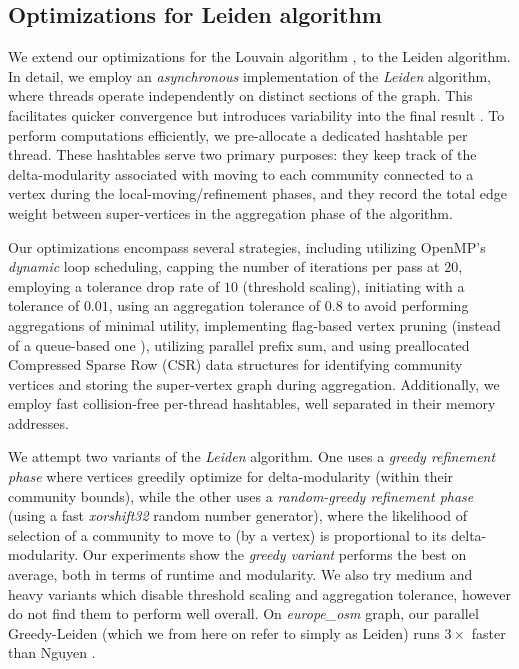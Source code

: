 \subsection{Optimizations for Leiden algorithm}
\label{sec:leiden}

We extend our optimizations for the Louvain algorithm \cite{sahu2023gvelouvain}, to the Leiden algorithm. In detail, we employ an \textit{asynchronous} implementation of the \textit{Leiden} algorithm, where threads operate independently on distinct sections of the graph. This facilitates quicker convergence but introduces variability into the final result \cite{com-blondel08}. To perform computations efficiently, we pre-allocate a dedicated hashtable per thread. These hashtables serve two primary purposes: they keep track of the delta-modularity associated with moving to each community connected to a vertex during the local-moving/refinement phases, and they record the total edge weight between super-vertices in the aggregation phase of the algorithm.

Our optimizations encompass several strategies, including utilizing OpenMP's \textit{dynamic} loop scheduling, capping the number of iterations per pass at $20$, employing a tolerance drop rate of $10$ (threshold scaling), initiating with a tolerance of $0.01$, using an aggregation tolerance of $0.8$ to avoid performing aggregations of minimal utility, implementing flag-based vertex pruning (instead of a queue-based one \cite{nguyenleiden}), utilizing parallel prefix sum, and using preallocated Compressed Sparse Row (CSR) data structures for identifying community vertices and storing the super-vertex graph during aggregation. Additionally, we employ fast collision-free per-thread hashtables, well separated in their memory addresses.

We attempt two variants of the \textit{Leiden} algorithm. One uses a \textit{greedy refinement phase} where vertices greedily optimize for delta-modularity (within their community bounds), while the other uses a \textit{random-greedy refinement phase} (using a fast \textit{xorshift32} random number generator), where the likelihood of selection of a community to move to (by a vertex) is proportional to its delta-modularity. Our experiments show the \textit{greedy variant} performs the best on average, both in terms of runtime and modularity. We also try medium and heavy variants which disable threshold scaling and aggregation tolerance, however do not find them to perform well overall. On \textit{europe\_osm} graph, our parallel Greedy-Leiden (which we from here on refer to simply as Leiden) runs $3\times$ faster than Nguyen \cite{nguyenleiden}.

